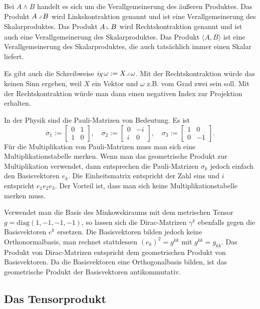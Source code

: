 \documentclass[a4paper,10pt,fleqn,twocolumn,twoside]{article}
\begin{document}
Bei $A\wedge B$ handelt es sich um die Verallgemeinerung des
äußeren Produktes.
Das Produkt $A\,\big\lrcorner\,B$ wird Linkskontraktion genannt
und ist eine Verallgemeinerung des Skalarproduktes.
Das Produkt $A\,\big\llcorner\,B$ wird Rechtskontraktion genannt
und ist auch eine Verallgemeinerung des Skalarproduktes.
Das Produkt $\langle A,B\rangle$ ist eine Verallgemeinerung des
Skalarproduktes, die auch tatsächlich immer einen Skalar liefert.

Es gibt auch die Schreibweise
$i_{\!X} \omega := X\big\lrcorner\,\omega$. Mit der
Rechtskontraktion würde das keinen Sinn ergeben, weil $X$ ein
Vektor und $\omega$ z.B. vom Grad zwei sein soll. Mit der
Rechtskontraktion würde man dann einen negativen Index zur
Projektion erhalten.

In der Physik sind die Pauli-Matrizen von Bedeutung. Es ist
\[
\sigma_1 := \begin{bmatrix}0 & 1\\ 1 & 0\end{bmatrix},\quad
\sigma_2 := \begin{bmatrix}0 & -i\\ i & 0\end{bmatrix},\quad
\sigma_3 := \begin{bmatrix}1 & 0\\ 0 & -1\end{bmatrix}.
\]
Für die Multiplikation von Pauli-Matrizen muss man sich
eine Multiplikationstabelle merken. Wenn man das geometrische
Produkt zur Multiplikation verwendet, dann entsprechen
die Pauli-Matrizen $\sigma_k$ jedoch einfach den
Basisvektoren $e_k$. Die Einheitsmatrix entspricht der Zahl eins
und $i$ entspricht $e_1e_2e_3$. Der Vorteil ist,
dass man sich keine Multiplikationstabelle merken muss.

Verwendet man die Basis des Minkowskiraums mit dem metrischen Tensor
$g=\mathrm{diag}(1,-1,-1,-1)$, so lassen sich die Dirac-Matrizen
$\gamma^k$ ebenfalls gegen die Basisvektoren $e^k$ ersetzen.
Die Basisvektoren bilden jedoch keine Orthonormalbasis, man rechnet
stattdessen $(e_k)^2=g^{kk}$ mit $g^{kk}=g_{kk}$. Das Produkt
von Dirac-Matrizen entspricht dem geometrischen Produkt von
Basisvektoren. Da die Basisvektoren eine Orthogonalbasis bilden,
ist das geometrische Produkt der Basisvektoren antikommutativ.


\subsection{Das Tensorprodukt}
\end{document}

